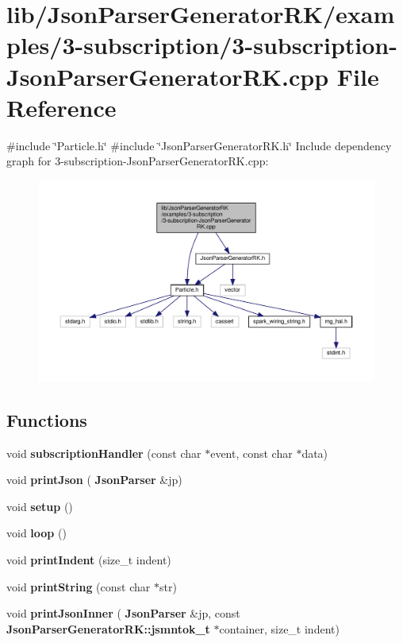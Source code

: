 \section{lib/\+Json\+Parser\+Generator\+R\+K/examples/3-\/subscription/3-\/subscription-\/\+Json\+Parser\+Generator\+RK.cpp File Reference}
\label{3-subscription-_json_parser_generator_r_k_8cpp}
{\ttfamily \#include \char`\"{}Particle.\+h\char`\"{}}\newline
{\ttfamily \#include \char`\"{}Json\+Parser\+Generator\+R\+K.\+h\char`\"{}}\newline
Include dependency graph for 3-\/subscription-\/\+Json\+Parser\+Generator\+RK.cpp\+:\nopagebreak
\begin{figure}[H]
\begin{center}
\leavevmode
\includegraphics[width=350pt]{3-subscription-_json_parser_generator_r_k_8cpp__incl}
\end{center}
\end{figure}
\subsection*{Functions}
\begin{DoxyCompactItemize}
\item 
void \textbf{ subscription\+Handler} (const char $\ast$event, const char $\ast$data)
\item 
void \textbf{ print\+Json} (\textbf{ Json\+Parser} \&jp)
\item 
void \textbf{ setup} ()
\item 
void \textbf{ loop} ()
\item 
void \textbf{ print\+Indent} (size\+\_\+t indent)
\item 
void \textbf{ print\+String} (const char $\ast$str)
\item 
void \textbf{ print\+Json\+Inner} (\textbf{ Json\+Parser} \&jp, const \textbf{ Json\+Parser\+Generator\+R\+K\+::jsmntok\+\_\+t} $\ast$container, size\+\_\+t indent)
\end{DoxyCompactItemize}
